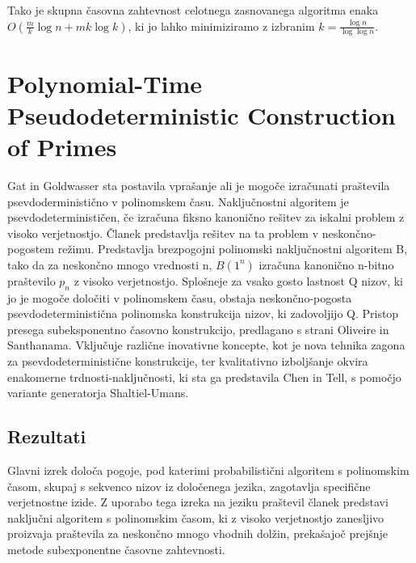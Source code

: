 \documentclass{article}
\begin{document}
Tako je skupna časovna zahtevnost celotnega zasnovanega algoritma enaka $O(\frac{m}{k}\log n + mk \log k)$, ki jo lahko minimiziramo z izbranim $k = \frac{\log n}{\log \log n}$.
\section{Polynomial-Time Pseudodeterministic Construction of Primes}
Gat in Goldwasser sta postavila vprašanje ali je mogoče izračunati praštevila psevdoderministično v polinomskem času. Naključnostni algoritem je psevdodeterminističen, če izračuna fiksno kanonično rešitev za iskalni problem z visoko verjetnostjo. Članek predstavlja rešitev na ta problem v neskončno-pogostem režimu. Predstavlja brezpogojni polinomski naključnostni algoritem B, tako da za neskončno mnogo vrednosti n, $B(1^n)$ izračuna kanonično n-bitno praštevilo $p_n$ z visoko verjetnostjo. Splošneje za vsako gosto lastnost Q nizov, ki jo je mogoče določiti v polinomskem času, obstaja neskončno-pogosta psevdodeterministična polinomska konstrukcija nizov, ki zadovoljijo Q. Pristop presega subeksponentno časovno konstrukcijo, predlagano s strani Oliveire in Santhanama. Vključuje različne inovativne koncepte, kot je nova tehnika zagona za psevdodeterministične konstrukcije, ter kvalitativno izboljšanje okvira enakomerne trdnosti-naključnosti, ki sta ga predstavila Chen in Tell, s pomočjo variante generatorja Shaltiel-Umans.

\subsection{Rezultati}
Glavni izrek določa pogoje, pod katerimi probabilistični algoritem s polinomskim časom, skupaj s sekvenco nizov iz določenega jezika, zagotavlja specifične verjetnostne izide. Z uporabo tega izreka na jeziku praštevil članek predstavi naključni algoritem s polinomskim časom, ki z visoko verjetnostjo zanesljivo proizvaja praštevila za neskončno mnogo vhodnih dolžin, prekašajoč prejšnje metode subexponentne časovne zahtevnosti.
\end{document}
